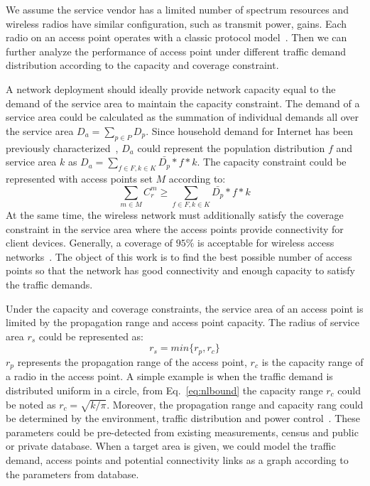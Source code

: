 We assume the service vendor has a limited number of spectrum resources and 
wireless radios have similar configuration, such as transmit power, 
gains. Each radio on an access point operates with a classic protocol 
model~\cite{gupta2000capacity}. Then we can further analyze the performance 
of access point under different traffic demand distribution according to the capacity 
and coverage constraint.

A network deployment should ideally provide network capacity equal to the demand of the service 
area to maintain the capacity constraint. The demand of a service area could be calculated as the 
summation of individual demands all over the service area $D_a=\sum_{p\in P}D_p$. Since 
household demand for Internet has been previously characterized~\cite{rosston2011household}, 
$D_a$ could represent the population distribution $f$ and service area $k$ as 
$D_a=\sum_{f \in F,k \in K}\bar{D_p}*f*k$. 
The capacity constraint could be represented with access points set $M$ according to:
\begin{equation}
\label{eq:nlbound}
\sum_{m \in M}C_r^m \ge \sum_{f \in F,k \in K}\bar{D_p}*f*k
\end{equation}
At the same time, the wireless network must additionally satisfy the coverage constraint in the service 
area where the access points provide connectivity for client devices. 
Generally, a coverage of $95\%$ is acceptable for wireless access networks~\cite{robinson2010deploying}.
The object of this work is to find the best possible number of access points so that the network has good 
connectivity and enough capacity to satisfy the traffic demands.

Under the capacity and coverage constraints, the service area of an access point 
is limited by the propagation range and access point capacity. 
The radius of service area $r_s$ could be represented as:
\begin{equation}
\label{eq:servicearea}
r_s=min\{r_p,r_c\}
\end{equation}
$r_p$ represents the propagation range of the access point, $r_c$ is the capacity range of 
a radio in the access point. A simple example is when the traffic demand is distributed uniform in a circle, from 
Eq.~\ref{eq:nlbound} the capacity range $r_c$ could be noted as $r_c=\sqrt{k/\pi}$. 
Moreover, the propagation range and capacity rang could be determined by the environment, traffic distribution and
power control~\cite{robinson2010deploying}. 
These parameters could be pre-detected from existing measurements, census and public or private database.
When a target area is given, we could model the traffic demand, access points and
potential connectivity links as a graph according to the parameters from database.


